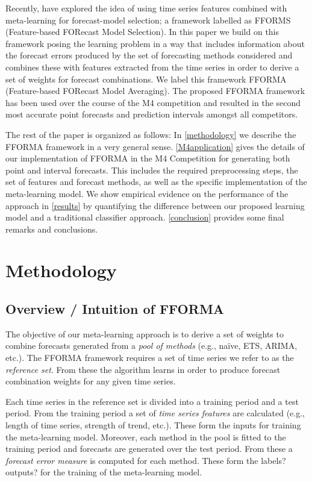 \documentclass[11pt,a4paper,]{article}
\theoremstyle{definition}
\theoremstyle{definition}
\theoremstyle{definition}
\theoremstyle{remark}
\begin{document}
Recently, \textcite{fforms} have explored the idea of using time series
features combined with meta-learning for forecast-model selection; a
framework labelled as FFORMS (Feature-based FORecast Model Selection).
In this paper we build on this framework posing the learning problem in
a way that includes information about the forecast errors produced by
the set of forecasting methods considered and combines these with
features extracted from the time series in order to derive a set of
weights for forecast combinations. We
label this framework FFORMA (Feature-based FORecast Model Averaging).
The proposed FFORMA framework has been used over the course of the M4
competition and resulted in the second most accurate point forecasts and
prediction intervals amongst all competitors.

The rest of the paper is organized as follows: In \autoref{methodology}
we describe the FFORMA framework in a very general sense.
\autoref{M4application} gives the details of our implementation of
FFORMA in the M4 Competition for generating both point and interval
forecasts. This includes the required preprocessing steps, the set of
features and forecast methods, as well as the specific implementation of
the meta-learning model. We show empirical evidence on the performance
of the approach in \autoref{results} by quantifying the difference
between our proposed learning model and a traditional classifier
approach. \autoref{conclusion} provides some final remarks and
conclusions.

\section{Methodology}\label{methodology}

\subsection{Overview / Intuition of
FFORMA}\label{overview-intuition-of-fforma}

The objective of our meta-learning approach is to derive a set of
weights to combine forecasts generated from a \emph{pool of methods}
(e.g., naïve, ETS, ARIMA, etc.). The FFORMA framework requires a set of
time series we refer to as the \emph{reference set}. From these the
algorithm learns in order to produce forecast combination weights for
any given time series.

Each time series in the reference set is divided into a training period
and a test period. From the training period a set of \emph{time series
features} are calculated (e.g., length of time series, strength of
trend, etc.). These form the inputs for training the meta-learning
model. Moreover, each method in the pool is fitted to the training
period and forecasts are generated over the test period. From these a
\emph{forecast error measure} is computed for each method. These form
the labels?outputs? for the training of the meta-learning model.
\end{document}
